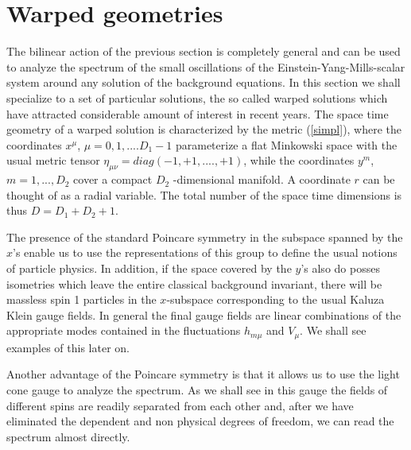 \documentclass[a4paper,12pt]{article}
\begin{document}
\section{Warped geometries}
The bilinear action of the previous section is completely general and
can be used to analyze the spectrum of the small oscillations of the
Einstein-Yang-Mills-scalar system around any solution of the
background equations. In this section we shall specialize to a set of
particular solutions, the so called warped solutions which have
attracted considerable amount of interest in recent years. The space
time geometry of a warped solution is characterized by the metric
(\ref{simpl}), where the coordinates $x^\mu$, $\mu=0, 1,....D_1-1$
parameterize a flat Minkowski space with the usual metric tensor
$\eta_{\mu\nu}= diag (-1, +1, ....,+1)$, while the coordinates $y^m$,
$m= 1,..., D_2$ cover a compact $D_2$ -dimensional manifold. A
coordinate $r$ can be thought of as a radial variable. The total
number of the space time dimensions is thus $D=D_1 + D_2 + 1$.

The presence of the standard Poincare symmetry in the subspace
spanned by the  $x$'s enable us to use the representations of this
group to define the usual notions of particle physics. In addition,
if the space covered by the $y$'s also do posses  isometries which
leave the entire classical background invariant, there will be
massless spin 1 particles in the $x$-subspace corresponding to the
usual Kaluza Klein gauge fields. In general the final gauge fields
are linear combinations of the appropriate modes contained in the
fluctuations $h_{m\mu}$ and $V_\mu$. We shall see examples of this
later on.

Another advantage of the Poincare symmetry is that it allows us to
use the light cone gauge to analyze the spectrum.  As we shall see in
this gauge the fields of different spins are readily separated from
each other and, after we have eliminated the dependent and non
physical degrees of freedom, we can read the spectrum almost
directly.
\end{document}
